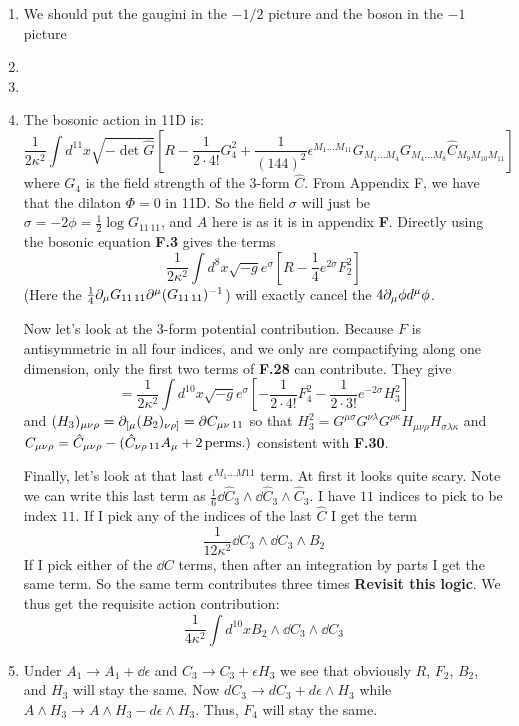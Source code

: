 \documentclass[11pt, class=article, crop=false]{standalone}
\begin{document}
\begin{enumerate}
	
	\item We should put the gaugini in the $-1/2$ picture and the boson in the $-1$  picture
	
	\item 
	
	\item 
	
	\item The bosonic action in 11D is:
	\[
		\frac{1}{2\kappa^2} \int d^{11} x \sqrt{-\det \hat G} \left[R - \frac{1}{2 \cdot 4!} G_4^2 + \frac{1}{(144)^2} \epsilon^{M_1 \dots M_{11}} G_{M_1 \dots M_4} G_{M_4 \dots M_8} \hat C_{M_9 M_{10} M_{11}}\right]
	\]
	where $G_4$ is the field strength of the 3-form $\hat C$. From Appendix F, we have that the dilaton $\Phi = 0$ in 11D. So the field $\sigma$ will just be $\sigma = -2\phi = \frac12 \log G_{11\, 11}$, and $A$ here is as it is in appendix \textbf{F}. Directly using the bosonic equation \textbf{F.3} gives the terms
	\[
		\frac{1}{2\kappa^2 }\int d^8 x \sqrt{-g} e^{\sigma} \left[R - \frac14 e^{2\sigma} F_2^2  \right]
	\]
	(Here the $\frac14 \partial_\mu G_{11\, 11} \partial^\mu (G_{11\, 11})^{-1}$) will exactly cancel the $4 \partial_\mu \phi d^\mu \phi$. 
	
	Now let's look at the $3$-form potential contribution. Because $F$ is antisymmetric in all four indices, and we only are compactifying along one dimension, only the first two terms of \textbf{F.28} can contribute. They give
	\[
		=\frac{1}{2\kappa^2} \int d^{10} x \sqrt{-g} e^\sigma \left[-\frac{1}{2 \cdot 4!} F_4^2 - \frac{1}{2 \cdot 3!} e^{-2\sigma} H_3^2 \right]
	\]
	and $(H_3)_{\mu \nu \rho} = \partial_{[\mu} (B_2)_{\nu \rho]} = \partial C_{\mu \nu\, 11}$ so that $H_3^2 = G^{\mu \sigma} G^{\nu \lambda} G^{\rho \kappa} H_{\mu \nu \rho} H_{\sigma \lambda \kappa}$ and $C_{\mu \nu \rho} = \hat C_{\mu \nu \rho} - (\hat C_{\nu \rho\, 11} A_\mu + 2 \,\mathrm{perms.})$  consistent with \textbf{F.30}.

	Finally, let's look at that last $\epsilon^{M_1 \dots M{11}}$ term. At first it looks quite scary. Note we can write this last term as $\frac16 \dd \hat C_3 \wedge \dd \hat C_3 \wedge \hat C_3$. I have $11$ indices to pick to be index $11$. If I pick any of the indices of the last $\hat C$ I get the term
	\[
		\frac{1}{12 \kappa^2} \dd C_3 \wedge \dd C_3 \wedge B_2
	\]
	If I pick either of the $\dd C$ terms, then after an integration by parts I get the same term. So the same term contributes three times \textbf{Revisit this logic}. We thus get the requisite action contribution:
	\[
		\frac{1}{4\kappa^2} \int d^{10} x B_2 \wedge \dd C_3 \wedge \dd C_3
	\]
	\item Under $A_1 \to A_1 + \dd \epsilon$ and $C_3 \to C_3 + \epsilon H_3$ we see that obviously $R$, $F_2$, $B_2$, and $H_3$ will stay the same. Now $dC_3 \to dC_3 + d\epsilon \wedge H_3$ while $A \wedge H_3 \to A \wedge H_3 - d \epsilon \wedge H_3$. Thus, $F_4$ will stay the same. 
	

\end{enumerate}
\end{document}
